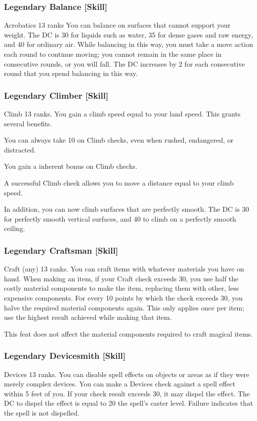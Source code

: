 \subsubsection{Legendary Balance [Skill]}
\featpre Acrobatics 13 ranks
\featben You can balance on surfaces that cannot support your weight. The DC is 30 for liquids such as water, 35 for dense gases and raw energy, and 40 for ordinary air. While balancing in this way, you must take a move action each round to continue moving; you cannot remain in the same place in consecutive rounds, or you will fall. The DC increases by 2 for each consecutive round that you spend balancing in this way.

\subsubsection{Legendary Climber [Skill]}
\featpre Climb 13 ranks.
\featben You gain a climb speed equal to your land speed. This grants several benefits. 
\begin{itemize*}
  \item You can always take 10 on Climb checks, even when rushed, endangered, or distracted. 
  \item You gain a  inherent bonus on Climb checks.
  \item A successful Climb check allows you to move a distance equal to your climb speed.
\end{itemize*}

In addition, you can now climb surfaces that are perfectly smooth. The DC is 30 for perfectly smooth vertical surfaces, and 40 to climb on a perfectly smooth ceiling.

\subsubsection{Legendary Craftsman [Skill]}
\featpre Craft (any) 13 ranks.
\featben You can craft items with whatever materials you have on hand. When making an item, if your Craft check exceeds 30, you use half the costly material components to make the item, replacing them with other, less expensive components. For every 10 points by which the check exceeds 30, you halve the required material components again. This only applies once per item; use the highest result achieved while making that item.

This feat does not affect the material components required to craft magical items.

\subsubsection{Legendary Devicesmith [Skill]}
\featpre Devices 13 ranks.
\featben You can disable spell effects on objects or areas as if they were merely complex devices. You can make a Devices check against a spell effect within 5 feet of you. If your check result exceeds 30, it may dispel the effect. The DC to dispel the effect is equal to 20 \add the spell's caster level. Failure indicates that the spell is not dispelled. 

